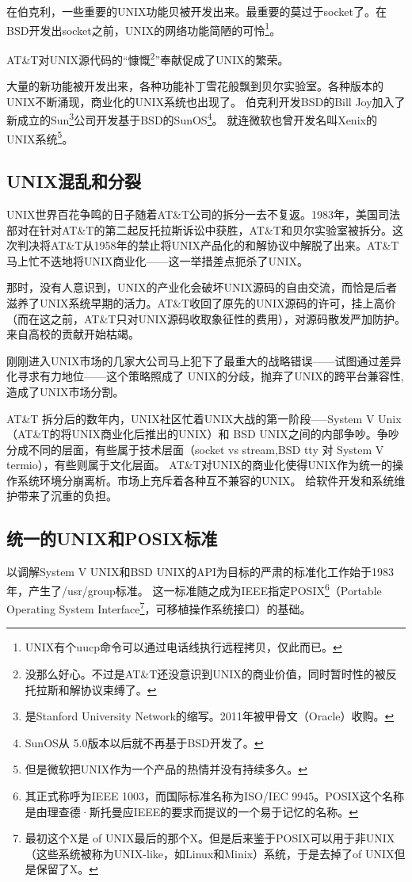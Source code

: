 \documentclass[amstex]{ctexbook}
\begin{document}
在伯克利，一些重要的UNIX功能贝被开发出来。最重要的莫过于socket了。在BSD开发出socket之前，UNIX的网络功能简陋的可怜\footnote{UNIX有个uucp命令可以通过电话线执行远程拷贝，仅此而已。}。

AT\&T对UNIX源代码的“慷慨\footnote{没那么好心。不过是AT\&T还没意识到UNIX的商业价值，同时暂时性的被反托拉斯和解协议束缚了。}”奉献促成了UNIX的繁荣。

大量的新功能被开发出来，各种功能补丁雪花般飘到贝尔实验室。各种版本的UNIX不断涌现，商业化的UNIX系统也出现了。
伯克利开发BSD的Bill Joy加入了新成立的Sun\footnote{是Stanford University Network的缩写。2011年被甲骨文（Oracle）收购。}公司开发基于BSD的SunOS\footnote{SunOS从 5.0版本以后就不再基于BSD开发了。}。
就连微软也曾开发名叫Xenix的UNIX系统\footnote{但是微软把UNIX作为一个产品的热情并没有持续多久。}。

\subsection{UNIX混乱和分裂}

UNIX世界百花争鸣的日子随着AT\&T公司的拆分一去不复返。1983年，美国司法部对在针对AT\&T的第二起反托拉斯诉讼中获胜，AT\&T和贝尔实验室被拆分。这次判决将AT\&T从1958年的禁止将UNIX产品化的和解协议中解脱了出来。AT\&T马上忙不迭地将UNIX商业化------这一举措差点扼杀了UNIX。

那时，没有人意识到，UNIX的产业化会破坏UNIX源码的自由交流，而恰是后者滋养了UNIX系统早期的活力。AT\&T收回了原先的UNIX源码的许可，挂上高价（而在这之前，AT\&T只对UNIX源码收取象征性的费用），对源码散发严加防护。来自高校的贡献开始枯竭。

刚刚进入UNIX市场的几家大公司马上犯下了最重大的战略错误------试图通过差异化寻求有力地位------这个策略照成了
UNIX的分歧，抛弃了UNIX的跨平台兼容性,造成了UNIX市场分割。

AT\&T 拆分后的数年内，UNIX社区忙着UNIX大战的第一阶段-----System V Unix（AT\&T的将UNIX商业化后推出的UNIX）和 BSD UNIX之间的内部争吵。争吵分成不同的层面，有些属于技术层面（socket vs stream,BSD tty 对 System V termio），有些则属于文化层面。
AT\&T对UNIX的商业化使得UNIX作为统一的操作系统环境分崩离析。市场上充斥着各种互不兼容的UNIX。
给软件开发和系统维护带来了沉重的负担。

\subsection{统一的UNIX和POSIX标准}

以调解System V UNIX和BSD UNIX的API为目标的严肃的标准化工作始于1983年，产生了/usr/group标准。
这一标准随之成为IEEE指定POSIX\footnote{其正式称呼为IEEE 1003，而国际标准名称为ISO/IEC 9945。POSIX这个名称是由理查德·斯托曼应IEEE的要求而提议的一个易于记忆的名称。}（Portable Operating System Interface\footnote{最初这个X是 of UNIX最后的那个X。但是后来鉴于POSIX可以用于非UNIX（这些系统被称为UNIX-like，如Linux和Minix）系统，于是去掉了of UNIX但是保留了X。 }，可移植操作系统接口）的基础。
\end{document}
